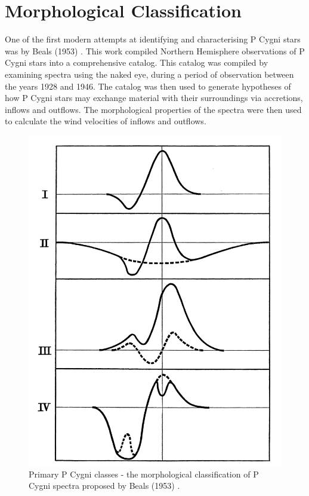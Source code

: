 \section{Morphological Classification}

One of the first modern attempts at identifying and characterising P Cygni stars was by Beals (1953) \cite{1953PDAO....9....1B}. This work compiled Northern Hemisphere observations of P Cygni stars into a comprehensive catalog. This catalog was compiled by examining spectra using the naked eye, during a period of observation between the years 1928 and 1946. The catalog was then used to generate hypotheses of how P Cygni stars may exchange material with their surroundings via accretions, inflows and outflows. The morphological properties of the spectra were then used to calculate the wind velocities of inflows and outflows. 

\begin{figure}[t]
\centering
\includegraphics[scale=.30]{figures/beals class 1.png}
\caption{Primary P Cygni classes - the morphological classification of P Cygni spectra proposed by Beals (1953) \cite{1953PDAO....9....1B}.}
\end{figure}

